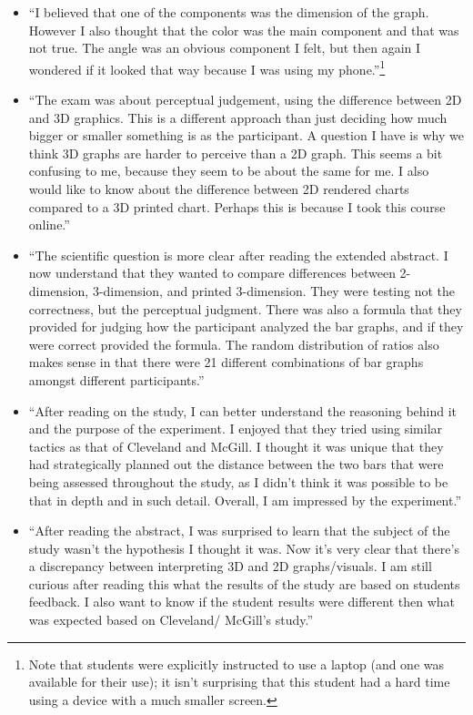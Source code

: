 \documentclass[runningheads
]{llncs}
\begin{document}
\begin{itemize}
\item
  ``I believed that one of the components was the dimension of the
  graph. However I also thought that the color was the main component
  and that was not true. The angle was an obvious component I felt, but
  then again I wondered if it looked that way because I was using my
  phone.''\footnote{Note that students were explicitly instructed to use
    a laptop (and one was available for their use); it isn't surprising
    that this student had a hard time using a device with a much smaller
    screen.}
\item
  ``The exam was about perceptual judgement, using the difference
  between 2D and 3D graphics. This is a different approach than just
  deciding how much bigger or smaller something is as the participant. A
  question I have is why we think 3D graphs are harder to perceive than
  a 2D graph. This seems a bit confusing to me, because they seem to be
  about the same for me. I also would like to know about the difference
  between 2D rendered charts compared to a 3D printed chart. Perhaps
  this is because I took this course online.''
\item
  ``The scientific question is more clear after reading the extended
  abstract. I now understand that they wanted to compare differences
  between 2-dimension, 3-dimension, and printed 3-dimension. They were
  testing not the correctness, but the perceptual judgment. There was
  also a formula that they provided for judging how the participant
  analyzed the bar graphs, and if they were correct provided the
  formula. The random distribution of ratios also makes sense in that
  there were 21 different combinations of bar graphs amongst different
  participants.''
\item
  ``After reading on the study, I can better understand the reasoning
  behind it and the purpose of the experiment. I enjoyed that they tried
  using similar tactics as that of Cleveland and McGill. I thought it
  was unique that they had strategically planned out the distance
  between the two bars that were being assessed throughout the study, as
  I didn't think it was possible to be that in depth and in such detail.
  Overall, I am impressed by the experiment.''
\item
  ``After reading the abstract, I was surprised to learn that the
  subject of the study wasn't the hypothesis I thought it was. Now it's
  very clear that there's a discrepancy between interpreting 3D and 2D
  graphs/visuals. I am still curious after reading this what the results
  of the study are based on students feedback. I also want to know if
  the student results were different then what was expected based on
  Cleveland/ McGill's study.''
\end{itemize}
\end{document}
